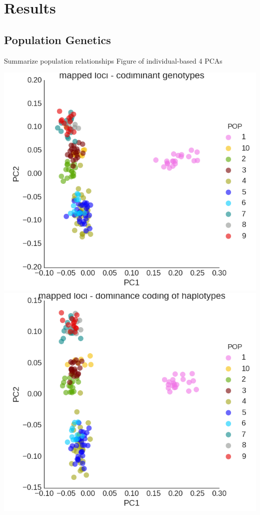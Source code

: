 \documentclass[12pt,  one column]{article}
\begin{document}
\section*{Results}

\subsection*{Population Genetics}

Summarize population relationships
Figure of individual-based 4 PCAs

\includegraphics[scale=.3]{figures/PCA_codom.png}
\includegraphics[scale=.3]{figures/PCA_dom.png}
\end{document}
